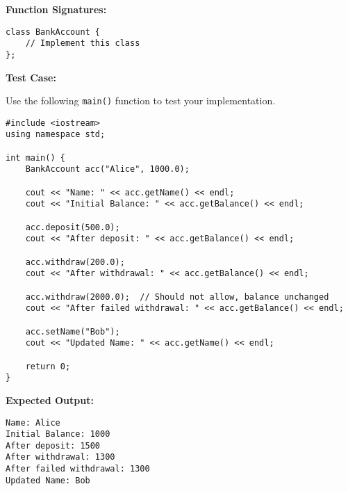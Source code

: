 \documentclass{article}
\begin{document}
\textbf{Function Signatures:}

\begin{lstlisting}[style=cppstyle]
class BankAccount {
    // Implement this class
};
\end{lstlisting}

\textbf{Test Case:}

Use the following \texttt{main()} function to test your implementation.

\begin{lstlisting}[style=cppstyle]
#include <iostream>
using namespace std;

int main() {
    BankAccount acc("Alice", 1000.0);
    
    cout << "Name: " << acc.getName() << endl;
    cout << "Initial Balance: " << acc.getBalance() << endl;
    
    acc.deposit(500.0);
    cout << "After deposit: " << acc.getBalance() << endl;
    
    acc.withdraw(200.0);
    cout << "After withdrawal: " << acc.getBalance() << endl;

    acc.withdraw(2000.0);  // Should not allow, balance unchanged
    cout << "After failed withdrawal: " << acc.getBalance() << endl;
    
    acc.setName("Bob");
    cout << "Updated Name: " << acc.getName() << endl;

    return 0;
}
\end{lstlisting}

\textbf{Expected Output:}

\begin{verbatim}
Name: Alice
Initial Balance: 1000
After deposit: 1500
After withdrawal: 1300
After failed withdrawal: 1300
Updated Name: Bob
\end{verbatim}

\end{document}
